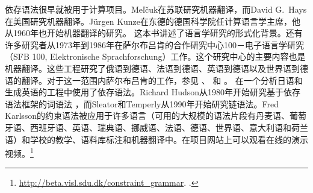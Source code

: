 依存语法很早就被用于计算项目。Meľčuk在苏联研究机器翻译，而David G.\ Hays在美国研究机器翻译。Jürgen Kunze在东德的德国科学院任计算语言学主席，他从1960年也开始机器翻译的研究。 这本书讲述了语言学研究的形式化背景。还有许多研究者从1973年到1986年在萨尔布吕肯的合作研究中心100－电子语言学研究（SFB 100, Elektronische Sprachforschung）工作。这个研究中心的主要内容也是机器翻译。这些工程研究了俄语到德语、法语到德语、英语到德语以及世界语到德语的翻译。对于这一范围内萨尔布吕肯的工作，参见 、 和 。 \citet{MIF85a}在一个分析日语和生成英语的工程中使用了依存语法。Richard Hudson从1980年开始研究基于依存语法框架的词语法\indexwg\citep{Hudson84a-u,Hudson2007a-u} ，而Sleator和Temperly从1990年开始研究链语法\citep{ST91a-u,GLS95a-u}。Fred Karlsson的约束语法\citeyearpar{Karlsson90a-u}被应用于许多语言（可用的大规模的语法片段有丹麦语、葡萄牙语、西班牙语、英语、瑞典语、挪威语、法语、德语、世界语、意大利语和荷兰语）和学校的教学、语料库标注和机器翻译中。在项目网站上可以观看在线的演示视频。\footnote{%
  \url{http://beta.visl.sdu.dk/constraint_grammar}. .
}

